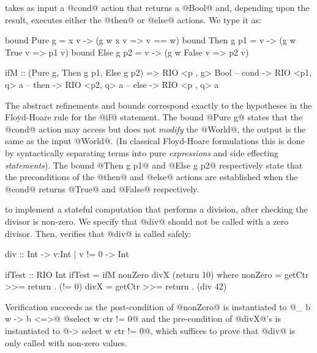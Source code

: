 takes as input a @cond@ action that returns a @Bool@ and,
depending upon the result, executes either
the @then@ or @else@ actions. We type it as:
%
\begin{code}
  bound Pure g    = \w x v -> (g w x v => v == w)
  bound Then g p1 = \w v   -> (g w True  v => p1 v)
  bound Else g p2 = \w v   -> (g w False v => p2 v)

  ifM :: (Pure g, Then g p1, Else g p2)
      => RIO <p , g> Bool       -- cond
      -> RIO <p1, q> a          -- then
      -> RIO <p2, q> a          -- else
      -> RIO <p , q> a
\end{code}
%
The abstract refinements and bounds 
correspond exactly to the hypotheses in the 
Floyd-Hoare rule for the @if@ statement.
%
The bound @Pure g@ states that the @cond@ 
action may access but does not \emph{modify} 
the @World@, \ie the output is the same 
as the input @World@. (In classical Floyd-Hoare 
formulations this is done by syntactically 
separating terms into pure \emph{expressions} 
and side effecting \emph{statements}).
%
The bound @Then g p1@ and @Else g p2@ respectively
state that the preconditions of the @then@ and @else@
actions are established when the @cond@ returns @True@
and @False@ respectively. 

 to implement a stateful 
computation that performs a division, after checking 
the divisor is non-zero.
%
We specify that @div@ should not be called with a zero divisor. 
Then, \toolname verifies that @div@ is called safely:
%
\begin{code}
  div :: Int -> {v:Int | v != 0} -> Int

  ifTest :: RIO Int
  ifTest = ifM nonZero divX (return 10)
    where nonZero = getCtr >>= return . (!= 0)
          divX    = getCtr >>= return . (div 42)
\end{code}
%
Verification succeeds as the post-condition of @nonZero@
is instantiated to 
{@\_ b w -> b <=>@ @select w ctr != 0@}
and the pre-condition of @divX@'s is instantiated to
{@\w -> select w ctr != 0@}, which suffices to 
prove that @div@ is only called with non-zero values.


